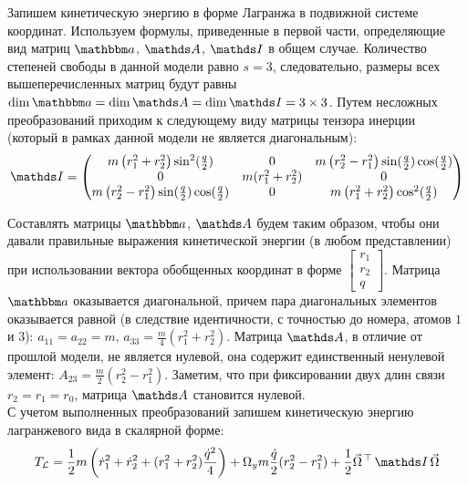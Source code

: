 Запишем кинетическую энергию в форме Лагранжа в подвижной системе координат. Используем формулы, приведенные в первой части, определяющие вид матриц $\bba$, $\bbA$, $\bbI$ в общем случае. Количество степеней свободы в данной модели равно $s = 3$, следовательно, размеры всех вышеперечисленных матриц будут равны $\dim \bba = \dim \bbA = \dim \bbI = 3 \times 3$. Путем несложных преобразований приходим к следующему виду матрицы тензора инерции (который в рамках данной модели не является диагональным):
\vverh
\begin{gather}
\bbI = \begin{pmatrix}
m \left( r_1^2 + r_2^2 \right) \sin^2 (\frac{q}{2}) & 0 & m \left( r_2^2 - r_1^2 \right) \sin (\frac{q}{2}) \cos(\frac{q}{2}) \\
0 & m (r_1^2 + r_2^2) & 0 \\
m \left( r_2^2 - r_1^2 \right) \sin(\frac{q}{2}) \cos(\frac{q}{2}) & 0 & m \left( r_1^2 + r_2^2 \right) \cos^2 (\frac{q}{2})
\end{pmatrix} \notag
\end{gather}

Составлять матрицы $\bba$, $\bbA$ будем таким образом, чтобы они давали правильные выражения кинетической энергии (в любом представлении) при использовании вектора обобщенных координат в форме $\begin{bmatrix} r_1 \\ r_2 \\ q \end{bmatrix}$. Матрица $\bba$ оказывается диагональной, причем пара диагональных элементов оказывается равной (в следствие идентичности, с точностью до номера, атомов $1$ и $3$): $a_{11} = a_{22} = m, \, a_{33} = \frac{m}{4} (r_1^2 + r_2^2)$. Матрица $\bbA$, в отличие от прошлой модели, не является нулевой, она содержит единственный ненулевой элемент: $A_{23} = \frac{m}{2} (r_2^2 - r_1^2)$. Заметим, что при фиксировании двух длин связи $r_2 = r_1 = r_0$, матрица $\bbA$ становится нулевой. \\
С учетом выполненных преобразований запишем кинетическую энергию лагранжевого вида в скалярной форме: 
\vverh
\begin{gather}
T_\mathcal{L} = \frac{1}{2} m \left(\dot{r}_1^2 + \dot{r}_2^2 + ( r_1^2 + r_2^2 ) \frac{\dot{q}^2}{4} \right) + \Omega_y m \frac{\dot{q}}{2} (r_2^2 - r_1^2 ) + \frac{1}{2} \vec{\Omega}^{\, \top} \, \bbI \, \vec{\Omega} \notag 
\end{gather}

